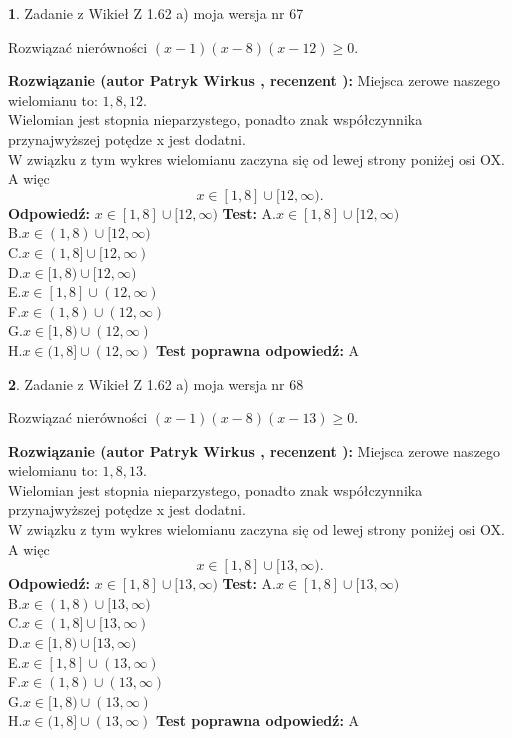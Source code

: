 \documentclass[12pt, a4paper]{article}
\theoremstyle{definition} %
\newtheorem{zad}{}
\newcommand{\zadStart}[1]{\begin{zad}#1\newline}
\newcommand{\zadStop}{\end{zad}}
\newcommand{\rozwStart}[2]{\noindent \textbf{Rozwiązanie (autor #1 , recenzent #2): }\newline}
\newcommand{\rozwStop}{\newline}
\newcommand{\odpStart}{\noindent \textbf{Odpowiedź:}\newline}
\newcommand{\odpStop}{\newline}
\newcommand{\testStart}{\noindent \textbf{Test:}\newline}
\newcommand{\testStop}{\newline}
\newcommand{\kluczStart}{\noindent \textbf{Test poprawna odpowiedź:}\newline}
\newcommand{\kluczStop}{\newline}
\begin{document}
\zadStart{Zadanie z Wikieł Z 1.62 a) moja wersja nr 67}

Rozwiązać nierówności $(x-1)(x-8)(x-12)\ge0$.
\zadStop
\rozwStart{Patryk Wirkus}{}
Miejsca zerowe naszego wielomianu to: $1, 8, 12$.\\
Wielomian jest stopnia nieparzystego, ponadto znak współczynnika przy\linebreak najwyższej potędze x jest dodatni.\\ W związku z tym wykres wielomianu zaczyna się od lewej strony poniżej osi OX. A więc $$x \in [1,8] \cup [12,\infty).$$
\rozwStop
\odpStart
$x \in [1,8] \cup [12,\infty)$
\odpStop
\testStart
A.$x \in [1,8] \cup [12,\infty)$\\
B.$x \in (1,8) \cup [12,\infty)$\\
C.$x \in (1,8] \cup [12,\infty)$\\
D.$x \in [1,8) \cup [12,\infty)$\\
E.$x \in [1,8] \cup (12,\infty)$\\
F.$x \in (1,8) \cup (12,\infty)$\\
G.$x \in [1,8) \cup (12,\infty)$\\
H.$x \in (1,8] \cup (12,\infty)$
\testStop
\kluczStart
A
\kluczStop



\zadStart{Zadanie z Wikieł Z 1.62 a) moja wersja nr 68}

Rozwiązać nierówności $(x-1)(x-8)(x-13)\ge0$.
\zadStop
\rozwStart{Patryk Wirkus}{}
Miejsca zerowe naszego wielomianu to: $1, 8, 13$.\\
Wielomian jest stopnia nieparzystego, ponadto znak współczynnika przy\linebreak najwyższej potędze x jest dodatni.\\ W związku z tym wykres wielomianu zaczyna się od lewej strony poniżej osi OX. A więc $$x \in [1,8] \cup [13,\infty).$$
\rozwStop
\odpStart
$x \in [1,8] \cup [13,\infty)$
\odpStop
\testStart
A.$x \in [1,8] \cup [13,\infty)$\\
B.$x \in (1,8) \cup [13,\infty)$\\
C.$x \in (1,8] \cup [13,\infty)$\\
D.$x \in [1,8) \cup [13,\infty)$\\
E.$x \in [1,8] \cup (13,\infty)$\\
F.$x \in (1,8) \cup (13,\infty)$\\
G.$x \in [1,8) \cup (13,\infty)$\\
H.$x \in (1,8] \cup (13,\infty)$
\testStop
\kluczStart
A
\kluczStop
\end{document}
